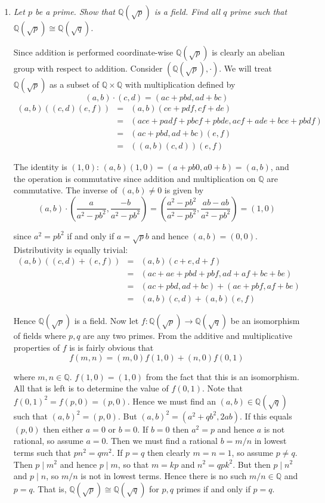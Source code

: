 \documentclass[10pt]{article}
\newcommand{\Q}{\mathbb{Q}}
\newcommand{\iso}{\cong}
\begin{document}
\begin{enumerate}
\item \emph{Let $p$ be a prime.  Show that $\Q(\sqrt{p})$ is a field.  Find all $q$ prime such that $\Q(\sqrt{p}) \iso \Q(\sqrt{q})$.}

Since addition is performed coordinate-wise $\Q(\sqrt{p})$ is clearly an abelian group with respect to addition.  Consider $(\Q(\sqrt{p}), \cdot)$.  We will treat $\Q(\sqrt{p})$ as a subset of $\Q \times \Q$ with multiplication defined by
\[
(a,b) \cdot (c,d) = (ac + pbd, ad+bc)
\]
\begin{eqnarray*}
(a,b)((c,d)(e,f)) &=& (a,b)(ce+pdf,cf+de) \\
&=& (ace+padf+pbcf+pbde,acf+ade+bce+pbdf) \\
&=& (ac+pbd,ad+bc)(e,f) \\
&=& ((a,b)(c,d))(e,f)
\end{eqnarray*}

The identity is $(1,0)$: $(a,b)(1,0) = (a + pb0, a0 + b) = (a,b)$, and the operation is commutative since addition and multiplication on $\Q$ are commutative.  The inverse of $(a,b) \neq 0$ is given by
\[
(a,b) \cdot \left(\frac{a}{a^2 - pb^2}, \frac{-b}{a^2 - pb^2}\right) = \left(\frac{a^2 - pb^2}{a^2 - pb^2}, \frac{ab-ab}{a^2 - pb^2}\right) = (1,0)
\]

since $a^2 = pb^2$ if and only if $a = \sqrt{p}b$ and hence $(a,b) = (0,0)$.  Distributivity is equally trivial:
\begin{eqnarray*}
(a,b)((c,d)+(e,f)) &=& (a,b)(c+e,d+f) \\
&=& (ac+ae+pbd+pbf,ad+af+bc+be) \\
&=&(ac+pbd,ad+bc)+(ae+pbf,af+be) \\
&=& (a,b)(c,d)+(a,b)(e,f)
\end{eqnarray*}

Hence $\Q(\sqrt{p})$ is a field.  Now let $f: \Q(\sqrt{p}) \rightarrow \Q(\sqrt{q})$ be an isomorphism of fields where $p,q$ are any two primes.  From the additive and multiplicative properties of $f$ is is fairly obvious that
\[
f(m,n) = (m,0)f(1,0) + (n,0)f(0,1)
\]

where $m,n \in \Q$. $f(1,0) = (1,0)$ from the fact that this is an isomorphism.  All that is left is to determine the value of $f(0,1)$.  Note that $f(0,1)^2 = f(p,0) = (p,0)$.  Hence we must find an $(a,b) \in \Q(\sqrt{q})$ such that $(a,b)^2 = (p,0)$.  But $(a,b)^2 = (a^2 + qb^2, 2ab)$.  If this equals $(p,0)$ then either $a = 0$ or $b = 0$.  If $b = 0$ then $a^2 = p$ and hence $a$ is not rational, so assume $a = 0$.  Then we must find a rational $b = m/n$ in lowest terms such that $pn^2 = qm^2$.  If $p = q$ then clearly $m=n=1$, so assume $p \neq q$.  Then $p \mid m^2$ and hence $p \mid m$, so that $m = kp$ and $n^2 = qpk^2$.  But then $p \mid n^2$ and $p \mid n$, so $m/n$ is not in lowest terms.  Hence there is no such $m/n \in \Q$ and $p = q$.  That is, $\Q(\sqrt{p}) \iso \Q(\sqrt{q})$ for $p,q$ primes if and only if $p = q$.


\end{enumerate}
\end{document}
